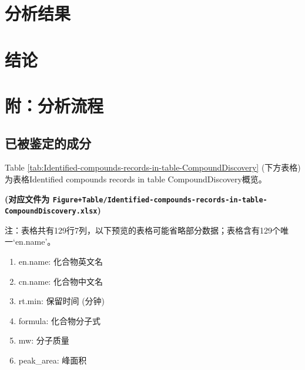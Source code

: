 \documentclass[
]{article}
\providecommand{\tightlist}{%
  \setlength{\itemsep}{0pt}\setlength{\parskip}{0pt}}
\begin{document}
\hypertarget{results}{%
\section{分析结果}\label{results}}

\hypertarget{dis}{%
\section{结论}\label{dis}}

\hypertarget{workflow}{%
\section{附：分析流程}\label{workflow}}

\hypertarget{ux5df2ux88abux9274ux5b9aux7684ux6210ux5206}{%
\subsection{已被鉴定的成分}\label{ux5df2ux88abux9274ux5b9aux7684ux6210ux5206}}

Table \ref{tab:Identified-compounds-records-in-table-CompoundDiscovery} (下方表格) 为表格Identified compounds records in table CompoundDiscovery概览。

\textbf{(对应文件为 \texttt{Figure+Table/Identified-compounds-records-in-table-CompoundDiscovery.xlsx})}

\begin{center}\begin{tcolorbox}[colback=gray!10, colframe=gray!50, width=0.9\linewidth, arc=1mm, boxrule=0.5pt]注：表格共有129行7列，以下预览的表格可能省略部分数据；表格含有129个唯一`en.name'。
\end{tcolorbox}
\end{center}
\begin{center}\begin{tcolorbox}[colback=gray!10, colframe=gray!50, width=0.9\linewidth, arc=1mm, boxrule=0.5pt]\begin{enumerate}\tightlist
\item en.name:  化合物英文名
\item cn.name:  化合物中文名
\item rt.min:  保留时间 (分钟)
\item formula:  化合物分子式
\item mw:  分子质量
\item peak\_area:  峰面积
\end{enumerate}\end{tcolorbox}
\end{center}
\end{document}
